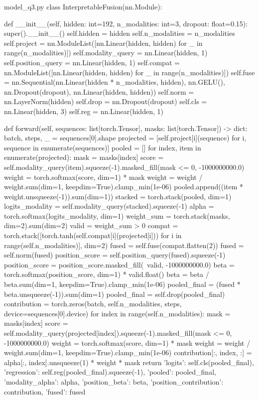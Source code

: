 \documentclass[bwprint]{gmcmthesis}
\begin{document}
\begin{appendices}
\begin{Python}{model\_q3.py}
class InterpretableFusion(nn.Module):

    def __init__(self, hidden: int=192, n_modalities: int=3, dropout: float=0.15):
        super().__init__()
        self.hidden = hidden
        self.n_modalities = n_modalities
        self.project = nn.ModuleList([nn.Linear(hidden, hidden) for _ in range(n_modalities)])
        self.modality_query = nn.Linear(hidden, 1)
        self.position_query = nn.Linear(hidden, 1)
        self.compat = nn.ModuleList([nn.Linear(hidden, hidden) for _ in range(n_modalities)])
        self.fuse = nn.Sequential(nn.Linear(hidden * n_modalities, hidden), nn.GELU(), nn.Dropout(dropout), nn.Linear(hidden, hidden))
        self.norm = nn.LayerNorm(hidden)
        self.drop = nn.Dropout(dropout)
        self.cls = nn.Linear(hidden, 3)
        self.reg = nn.Linear(hidden, 1)

    def forward(self, sequences: list[torch.Tensor], masks: list[torch.Tensor]) -> dict:
        batch, steps, _ = sequences[0].shape
        projected = [self.project[i](sequence) for i, sequence in enumerate(sequences)]
        pooled = []
        for index, item in enumerate(projected):
            mask = masks[index]
            score = self.modality_query(item).squeeze(-1).masked_fill(mask <= 0, -1000000000.0)
            weight = torch.softmax(score, dim=1) * mask
            weight = weight / weight.sum(dim=1, keepdim=True).clamp_min(1e-06)
            pooled.append((item * weight.unsqueeze(-1)).sum(dim=1))
        stacked = torch.stack(pooled, dim=1)
        logits_modality = self.modality_query(stacked).squeeze(-1)
        alpha = torch.softmax(logits_modality, dim=1)
        weight_sum = torch.stack(masks, dim=2).sum(dim=2)
        valid = weight_sum > 0
        compat = torch.stack([torch.tanh(self.compat[i](projected[i])) for i in range(self.n_modalities)], dim=2)
        fused = self.fuse(compat.flatten(2))
        fused = self.norm(fused)
        position_score = self.position_query(fused).squeeze(-1)
        position_score = position_score.masked_fill(~valid, -1000000000.0)
        beta = torch.softmax(position_score, dim=1) * valid.float()
        beta = beta / beta.sum(dim=1, keepdim=True).clamp_min(1e-06)
        pooled_final = (fused * beta.unsqueeze(-1)).sum(dim=1)
        pooled_final = self.drop(pooled_final)
        contribution = torch.zeros(batch, self.n_modalities, steps, device=sequences[0].device)
        for index in range(self.n_modalities):
            mask = masks[index]
            score = self.modality_query(projected[index]).squeeze(-1).masked_fill(mask <= 0, -1000000000.0)
            weight = torch.softmax(score, dim=1) * mask
            weight = weight / weight.sum(dim=1, keepdim=True).clamp_min(1e-06)
            contribution[:, index, :] = alpha[:, index].unsqueeze(1) * weight * mask
        return {'logits': self.cls(pooled_final), 'regression': self.reg(pooled_final).squeeze(-1), 'pooled': pooled_final, 'modality_alpha': alpha, 'position_beta': beta, 'position_contribution': contribution, 'fused': fused}


\end{Python}
\end{appendices}
\end{document}
